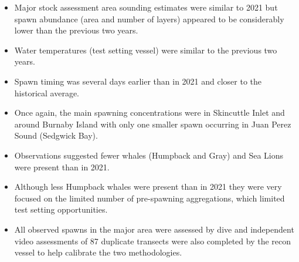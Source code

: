 \begin{itemize}

\item Major stock assessment area sounding estimates
were similar to 2021 but spawn abundance (area and number of layers)
appeared to be considerably lower than the previous two years.

\item Water temperatures (test setting vessel) were similar to the previous two years.

\item Spawn timing was several days earlier than in 2021
and closer to the historical average.

\item Once again, the main spawning concentrations were in Skincuttle Inlet
and around Burnaby Island with only one smaller spawn
occurring in Juan Perez Sound (Sedgwick Bay).

\item Observations suggested fewer whales (Humpback and Gray)
and Sea Lions were present than in 2021.

\item Although less Humpback whales were present than in 2021
they were very focused on the limited number of pre-spawning aggregations,
which limited test setting opportunities.

\item All observed spawns in the major area were assessed by dive and
independent video assessments of 87 duplicate transects
were also completed by the recon vessel to help calibrate the two methodologies.

\end{itemize}